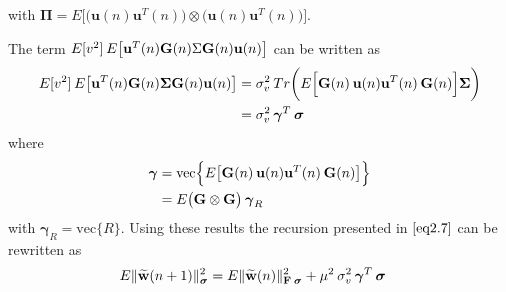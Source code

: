 \documentclass[journal, one column]{IEEEtran}
\begin{document}
with $\boldsymbol{\Pi}= E\Big[\big(\textbf{u}(n) \textbf{u}^{T}(n) \big) \otimes \big(\textbf{u}(n) \textbf{u}^{T}(n)\big) \Big]$.
\par
The term $E[v^{2}] \hspace{0.2em} E\big[\textbf{u}^{T}(n) \textbf{G}(n) \Sigma \textbf{G}(n) \textbf{u}(n) \big]$ can be written as
\begin{equation}\label{eq2.13}
\begin{split}
E[v^{2}] \hspace{0.2em} E\big[\textbf{u}^{T}(n) \textbf{G}(n) \boldsymbol{\Sigma} \textbf{G}(n) \textbf{u}(n) \big]&=\sigma^{2}_{v} \hspace{0.2em} Tr\bigg(E\Big[ \textbf{G}(n) \hspace{0.2em} \textbf{u}(n)\textbf{u}^{T}(n) \hspace{0.2em} \textbf{G}(n) \Big] \boldsymbol{\Sigma}  \bigg)\\
&= \sigma^{2}_{v} \hspace{0.2em} \boldsymbol{\gamma}^{T} \hspace{0.2em} \boldsymbol{\sigma}
\end{split}
\end{equation}
where
\begin{equation}\label{eq2.14}
\begin{split}
\boldsymbol{\gamma}&= \text{vec}\Big\{E\big[ \textbf{G}(n) \hspace{0.2em} \textbf{u}(n)\textbf{u}^{T}(n) \hspace{0.2em} \textbf{G}(n) \big]\Big\}\\
&=E \big(\textbf{G} \otimes \textbf{G} \big) \hspace{0.2em}\boldsymbol{\gamma}_{R}
\end{split}
\end{equation}
with $\boldsymbol{\gamma}_{R}= \text{vec}\{R\}$. Using these results the recursion presented in $\eqref{eq2.7}$ can be rewritten as
\begin{equation}\label{eq2.15}
\begin{split}
E\|\widetilde{\textbf{w}}(n+1)\|_{\boldsymbol{\sigma}}^{2}&= E\|\widetilde{\textbf{w}}(n)\|_{\textbf{F} \hspace{0.2em} \boldsymbol{\sigma}}^{2}
+ \mu^{2} \hspace{0.2em} \sigma^{2}_{v} \hspace{0.2em} \boldsymbol{\gamma}^{T} \hspace{0.2em} \boldsymbol{\sigma}
\end{split}
\end{equation}
\end{document}
